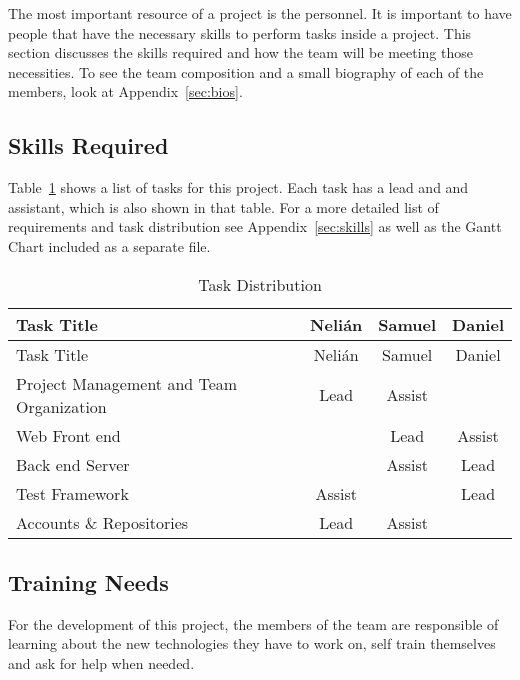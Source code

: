 The most important resource of a project is the personnel. It is important
to have people that have the necessary skills to perform tasks inside a 
project. This section discusses the skills required and how 
the team will be meeting those necessities. To see the team composition 
and a small biography of each of the members, look at Appendix~\ref{sec:bios}.

\subsection{Skills Required}

Table~\ref{tasks} shows a list of tasks for this project. Each task has a lead
and and assistant, which is also shown in that table. For a more detailed list
of requirements and task distribution see Appendix~\ref{sec:skills} as well as
the Gantt Chart included as a separate file.

\begin{center}
\setlength{\extrarowheight}{1.5pt}
  \begin{longtable}{|m{3.25in}|c|c|c|}
 \caption{Task Distribution \label{tasks}} \\
   \hline
  
  \centering Task Title & Nelián & Samuel & Daniel \\
  \hline \hline \endfirsthead
  
     \hline

	\centering Task Title & Nelián & Samuel & Daniel \\  
	\hline \hline \endhead
  
  \endfoot  
  
  Project Management and Team Organization & Lead & Assist & \\ \hline
  Web Front end & & Lead & Assist \\ \hline
  Back end Server & & Assist & Lead \\ \hline
  Test Framework & Assist & & Lead \\ \hline
  Accounts \& Repositories & Lead & Assist & \\ \hline
   \end{longtable}
\end{center}

\subsection{Training Needs}

For the development of this project, the members of the team are responsible of
learning about the new technologies they have to work on, self train themselves
and ask for help when needed.

